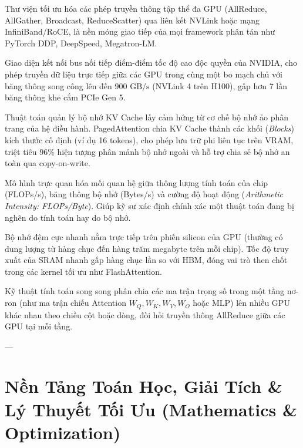 \begin{description}[leftmargin=2.5cm, style=nextline]
  \item[\term{NCCL (NVIDIA Collective Communications Library)}] Thư viện tối ưu hóa các phép truyền thông tập thể đa GPU (AllReduce, AllGather, Broadcast, ReduceScatter) qua liên kết NVLink hoặc mạng InfiniBand/RoCE, là nền móng giao tiếp của mọi framework phân tán như PyTorch DDP, DeepSpeed, Megatron-LM.

  \item[\term{NVLink}] Giao diện kết nối bus nối tiếp điểm-điểm tốc độ cao độc quyền của NVIDIA, cho phép truyền dữ liệu trực tiếp giữa các GPU trong cùng một bo mạch chủ với băng thông song công lên đến $900\text{ GB/s}$ (NVLink 4 trên H100), gấp hơn 7 lần băng thông khe cắm PCIe Gen 5.

  \item[\term{PagedAttention}] Thuật toán quản lý bộ nhớ KV Cache lấy cảm hứng từ cơ chế bộ nhớ ảo phân trang của hệ điều hành. PagedAttention chia KV Cache thành các khối (\textit{Blocks}) kích thước cố định (ví dụ 16 tokens), cho phép lưu trữ phi liên tục trên VRAM, triệt tiêu $96\%$ hiện tượng phân mảnh bộ nhớ ngoài và hỗ trợ chia sẻ bộ nhớ an toàn qua copy-on-write.

  \item[\term{Roofline Model}] Mô hình trực quan hóa mối quan hệ giữa thông lượng tính toán của chip (FLOPs/s), băng thông bộ nhớ (Bytes/s) và cường độ hoạt động (\textit{Arithmetic Intensity: FLOPs/Byte}). Giúp kỹ sư xác định chính xác một thuật toán đang bị nghẽn do tính toán hay do bộ nhớ.

  \item[\term{SRAM (Static RAM)}] Bộ nhớ đệm cực nhanh nằm trực tiếp trên phiến silicon của GPU (thường có dung lượng từ hàng chục đến hàng trăm megabyte trên mỗi chip). Tốc độ truy xuất của SRAM nhanh gấp hàng chục lần so với HBM, đóng vai trò then chốt trong các kernel tối ưu như FlashAttention.

  \item[\term{Tensor Parallelism (TP)}] Kỹ thuật tính toán song song phân chia các ma trận trọng số trong một tầng nơ-ron (như ma trận chiếu Attention $W_Q, W_K, W_V, W_O$ hoặc MLP) lên nhiều GPU khác nhau theo chiều cột hoặc dòng, đòi hỏi truyền thông AllReduce giữa các GPU tại mỗi tầng.
\end{description}

---

\section{Nền Tảng Toán Học, Giải Tích \& Lý Thuyết Tối Ưu (Mathematics \& Optimization)}
\label{sec:app-glossary-math-core}

